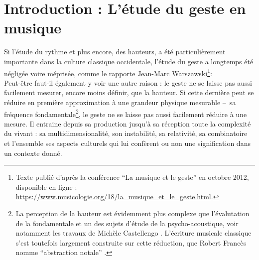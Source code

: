 \clearpage

\section{Introduction : L'étude du geste en musique}

\noindent Si l'étude du rythme et plus encore, des hauteurs, a été particulièrement importante dans la culture classique occidentale, l'étude du geste a longtemps été négligée voire méprisée, comme le rapporte Jean-Marc Warszawski\footnote{Texte publié d'après la conférence ``La musique et le geste'' en octobre 2012, disponible en ligne : \url{https://www.musicologie.org/18/la_musique_et_le_geste.html}.}: \\
\indent Peut-être faut-il également y voir une autre raison : le geste ne se laisse pas aussi facilement mesurer, encore moins définir, que la hauteur. Si cette dernière peut se  réduire en première approximation à une grandeur physique mesurable --~sa fréquence fondamentale\footnote{La perception de la hauteur est évidemment plus complexe que l'évalutation de la fondamentale et un des sujets d'étude de la psycho-acoustique, voir notamment les travaux de Michèle Castellengo \cite{castellengo_ecoute_2015}. L'écriture musicale classique s'est toutefois largement construite sur cette réduction, que Robert Francès nomme ``abstraction notale'' \cite{frances_perception_1984}.}, le geste ne se laisse pas aussi facilement réduire à une mesure. Il entraine depuis sa production jusqu'à sa réception toute la complexité du vivant : sa multidimensionalité, son instabilité, sa relativité, sa combinatoire et l'ensemble ses aspects culturels qui lui confèrent ou non une signification dans un contexte donné.\\

